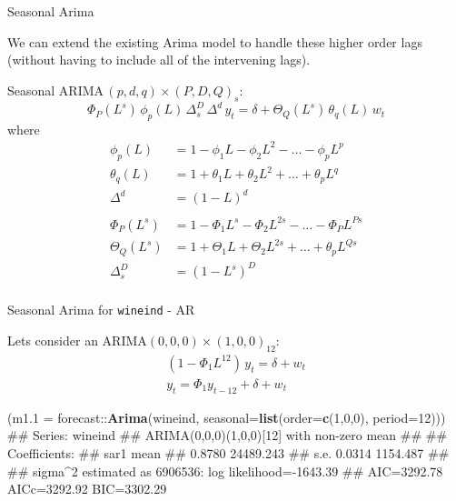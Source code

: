 \documentclass[11pt,ignorenonframetext,]{beamer}
\newenvironment{Shaded}{}{}
\newcommand{\DataTypeTok}[1]{\textcolor[rgb]{0.56,0.13,0.00}{#1}}
\newcommand{\DecValTok}[1]{\textcolor[rgb]{0.25,0.63,0.44}{#1}}
\newcommand{\KeywordTok}[1]{\textcolor[rgb]{0.00,0.44,0.13}{\textbf{#1}}}
\newcommand{\NormalTok}[1]{#1}
\newcommand{\OperatorTok}[1]{\textcolor[rgb]{0.40,0.40,0.40}{#1}}
\let\oldShaded\Shaded
\let\endoldShaded\endShaded
\renewenvironment{Shaded}{\footnotesize\begin{spacing}{0.9}\oldShaded}{\endoldShaded\end{spacing}}
\begin{document}
\begin{frame}[t]{%
\protect\hypertarget{seasonal-arima}{%
Seasonal Arima}}

We can extend the existing Arima model to handle these higher order lags
(without having to include all of the intervening lags).

\vspace{3mm}

Seasonal \(\text{ARIMA}\,(p,d,q) \times (P,D,Q)_s\):
\[ \Phi_P(L^s) \, \phi_p(L) \, \Delta_s^D \, \Delta^d \, y_t = \delta + \Theta_Q(L^s) \, \theta_q(L) \, w_t\]
\pause where \[
\begin{aligned}
\phi_p(L) &= 1-\phi_1 L - \phi_2 L^2 - \ldots - \phi_p L^p\\
\theta_q(L) &= 1+\theta_1 L + \theta_2 L^2 + \ldots + \theta_p L^q \\
\Delta^d &= (1-L)^d\\
\\
\Phi_P(L^s) &= 1-\Phi_1 L^s - \Phi_2 L^{2s} - \ldots - \Phi_P L^{Ps} \\
\Theta_Q(L^s) &= 1+\Theta_1 L + \Theta_2 L^{2s} + \ldots + \theta_p L^{Qs} \\
\Delta_s^D &= (1-L^s)^D\\
\end{aligned}
\]

\end{frame}

\begin{frame}[fragile]{%
\protect\hypertarget{seasonal-arima-for---ar}{%
Seasonal Arima for \texttt{wineind} - AR}}

Lets consider an \(\text{ARIMA}(0,0,0) \times (1,0,0)_{12}\): \[
\begin{aligned}
(1-\Phi_1 L^{12}) \, y_t = \delta + w_t \\
y_t = \Phi_1 y_{t-12} + \delta + w_t
\end{aligned}
\] \vspace{2mm}

\begin{Shaded}
\begin{Highlighting}[]
\NormalTok{(}\DataTypeTok{m1.1 =}\NormalTok{ forecast}\OperatorTok{::}\KeywordTok{Arima}\NormalTok{(wineind, }\DataTypeTok{seasonal=}\KeywordTok{list}\NormalTok{(}\DataTypeTok{order=}\KeywordTok{c}\NormalTok{(}\DecValTok{1}\NormalTok{,}\DecValTok{0}\NormalTok{,}\DecValTok{0}\NormalTok{), }\DataTypeTok{period=}\DecValTok{12}\NormalTok{)))}
\NormalTok{## Series: wineind }
\NormalTok{## ARIMA(0,0,0)(1,0,0)[12] with non-zero mean }
\NormalTok{## }
\NormalTok{## Coefficients:}
\NormalTok{##         sar1       mean}
\NormalTok{##       0.8780  24489.243}
\NormalTok{## s.e.  0.0314   1154.487}
\NormalTok{## }
\NormalTok{## sigma^2 estimated as 6906536:  log likelihood=-1643.39}
\NormalTok{## AIC=3292.78   AICc=3292.92   BIC=3302.29}
\end{Highlighting}
\end{Shaded}

\end{frame}
\end{document}
